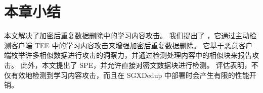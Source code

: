 \section{本章小结}
\label{sec:featurespy-conclusion}
本文解决了加密后重复数据删除中的学习内容攻击。 我们提出了 \sysnameF，它通过主动检测客户端 TEE 中的学习内容攻击来增强加密后重复数据删除。 它基于恶意客户端枚举许多相似数据进行攻击的洞察力，并通过检测处理内容中的相似块来报告攻击。 此外，本文提出了 SPE，并允许直接对密文数据块进行检测。 评估表明，\sysnameF 不仅有效地检测到学习内容攻击，而且在 SGXDedup \cite{ren21} 中部署时会产生有限的性能开销。
